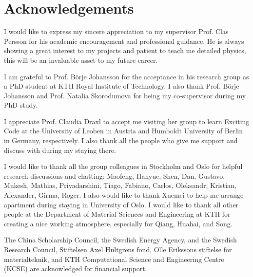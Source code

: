 \documentclass[a4paper, 12pt, titlepage,oneside,drop]{kthesis}
\begin{document}
\chapter*{Acknowledgements} 

I would like to express my sincere appreciation to my supervisor Prof. Clas Persson for his academic encouragement and professional guidance. He is always showing a great interest to my projects and patient to teach me detailed
physics, this will be an invaluable asset to my future career.

I am grateful to Prof. Börje Johansson for the acceptance in his research group as a PhD student at KTH Royal Institute of Technology. I also thank Prof. Börje Johansson and Prof. Natalia Skorodumova for being my co-supervisor during my PhD study.

I appreciate Prof. Claudia Draxl to accept me visiting her group to learn Exciting Code at the University of Leoben in Austria and Humboldt University of Berlin in Germany, respectively. I also thank all the people who give me support and
discuss with during my staying there.

I would like to thank all the group colleagues in Stockholm and Oslo for helpful research discussions and chatting: Maofeng, Hanyue, Shen, Dan, Gustavo, Mukesh, Mathias, Priyadarshini, Tiago, Fabiano, Carlos, Oleksandr, Kristian,  Alexander, Girma, Roger. 
I also would like to thank Xuemei to help me arrange apartment during staying in University of Oslo. I would like to thank all other people at the Department of Material Sciences and Engineering at KTH for creating a nice working atmosphere,
especially for Qiang, Huahai, and Song.

The China Scholarship Council, the Swedish Energy Agency, and the Swedish Research Council, Stiftelsen Axel Hultgrens fond,  Olle Erikssons stiftelse för materialteknik, and KTH Computational Science and Engineering Centre (KCSE) 
are acknowledged for financial support.





\end{document}
